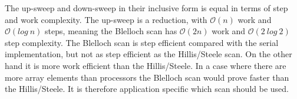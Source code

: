 The up-sweep and down-sweep in their inclusive form is equal in terms of step and work complexity. The up-sweep is a reduction, with $\mathcal{O}(n)$ work and $\mathcal{O}(log~n)$ steps, meaning the Blelloch scan has $\mathcal{O}(2n)$ work and $\mathcal{O}(2~log~2)$ step complexity. The Blelloch scan is step efficient compared with the serial implementation, but not as step efficient as the Hillis/Steele scan. On the other hand it is more work efficient than the Hillis/Steele. In a case where there are more array elements than processors the Blelloch scan would prove faster than the Hillis/Steele. It is therefore application specific which scan should be used.